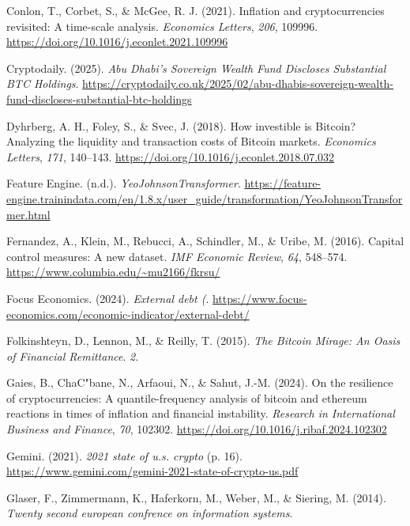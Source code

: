 \documentclass[
]{article}
\newlength{\cslhangindent}
\newenvironment{CSLReferences}[2] %
 {\begin{list}{}{%
  \setlength{\itemindent}{0pt}
  \setlength{\leftmargin}{0pt}
  \setlength{\parsep}{0pt}
  \ifodd #1
   \setlength{\leftmargin}{\cslhangindent}
   \setlength{\itemindent}{-1\cslhangindent}
  \fi
  \setlength{\itemsep}{#2\baselineskip}}}
 {\end{list}}
\begin{document}
\begin{CSLReferences}{1}{0}
Conlon, T., Corbet, S., \& McGee, R. J. (2021). Inflation and cryptocurrencies revisited: A time-scale analysis. \emph{Economics Letters}, \emph{206}, 109996. \url{https://doi.org/10.1016/j.econlet.2021.109996}

Cryptodaily. (2025). \emph{Abu Dhabi{'}s Sovereign Wealth Fund Discloses Substantial BTC Holdings}. \url{https://cryptodaily.co.uk/2025/02/abu-dhabis-sovereign-wealth-fund-discloses-substantial-btc-holdings}

Dyhrberg, A. H., Foley, S., \& Svec, J. (2018). How investible is Bitcoin? Analyzing the liquidity and transaction costs of Bitcoin markets. \emph{Economics Letters}, \emph{171}, 140--143. \url{https://doi.org/10.1016/j.econlet.2018.07.032}

Feature Engine. (n.d.). \emph{YeoJohnsonTransformer}. \url{https://feature-engine.trainindata.com/en/1.8.x/user_guide/transformation/YeoJohnsonTransformer.html}

Fernandez, A., Klein, M., Rebucci, A., Schindler, M., \& Uribe, M. (2016). Capital control measures: A new dataset. \emph{IMF Economic Review}, \emph{64}, 548--574. \url{https://www.columbia.edu/~mu2166/fkrsu/}

Focus Economics. (2024). \emph{External debt (}. \url{https://www.focus-economics.com/economic-indicator/external-debt/}

Folkinshteyn, D., Lennon, M., \& Reilly, T. (2015). \emph{The Bitcoin Mirage: An Oasis of Financial Remittance}. \emph{2}.

Gaies, B., ChaC"bane, N., Arfaoui, N., \& Sahut, J.-M. (2024). On the resilience of cryptocurrencies: A quantile-frequency analysis of bitcoin and ethereum reactions in times of inflation and financial instability. \emph{Research in International Business and Finance}, \emph{70}, 102302. \url{https://doi.org/10.1016/j.ribaf.2024.102302}

Gemini. (2021). \emph{2021 state of u.s. crypto} (p. 16). \url{https://www.gemini.com/gemini-2021-state-of-crypto-us.pdf}

Glaser, F., Zimmermann, K., Haferkorn, M., Weber, M., \& Siering, M. (2014). \emph{Twenty second european confrence on information systems}.


\end{CSLReferences}
\end{document}
